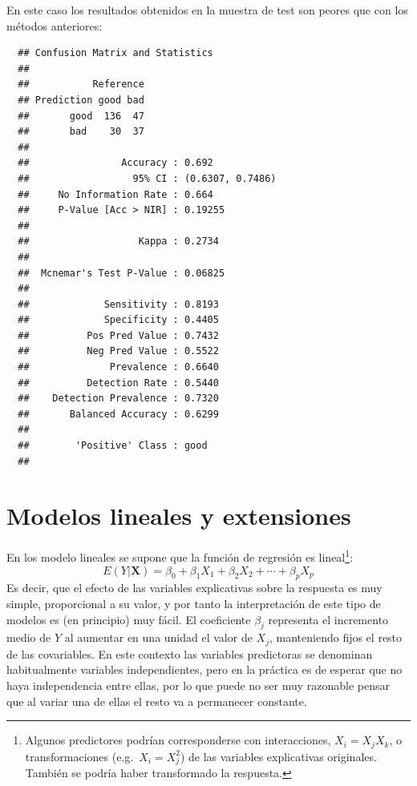 \documentclass[
]{book}
\newenvironment{Shaded}{\begin{snugshade}}{\end{snugshade}}
\newcommand{\AttributeTok}[1]{\textcolor[rgb]{0.77,0.63,0.00}{#1}}
\newcommand{\CommentTok}[1]{\textcolor[rgb]{0.56,0.35,0.01}{\textit{#1}}}
\newcommand{\FunctionTok}[1]{\textcolor[rgb]{0.00,0.00,0.00}{#1}}
\newcommand{\NormalTok}[1]{#1}
\newcommand{\OtherTok}[1]{\textcolor[rgb]{0.56,0.35,0.01}{#1}}
\newcommand{\SpecialCharTok}[1]{\textcolor[rgb]{0.00,0.00,0.00}{#1}}
\theoremstyle{break}
\theoremstyle{nonumberplain}
\renewcommand{\CommentTok}[1]{\textcolor[rgb]{0.41,0.41,0.41}{\texttt{#1}}}
\begin{document}
En este caso los resultados obtenidos en la muestra de test son peores que con los métodos anteriores:

\begin{Shaded}
\end{Shaded}

\begin{verbatim}
  ## Confusion Matrix and Statistics
  ## 
  ##           Reference
  ## Prediction good bad
  ##       good  136  47
  ##       bad    30  37
  ##                                           
  ##                Accuracy : 0.692           
  ##                  95% CI : (0.6307, 0.7486)
  ##     No Information Rate : 0.664           
  ##     P-Value [Acc > NIR] : 0.19255         
  ##                                           
  ##                   Kappa : 0.2734          
  ##                                           
  ##  Mcnemar's Test P-Value : 0.06825         
  ##                                           
  ##             Sensitivity : 0.8193          
  ##             Specificity : 0.4405          
  ##          Pos Pred Value : 0.7432          
  ##          Neg Pred Value : 0.5522          
  ##              Prevalence : 0.6640          
  ##          Detection Rate : 0.5440          
  ##    Detection Prevalence : 0.7320          
  ##       Balanced Accuracy : 0.6299          
  ##                                           
  ##        'Positive' Class : good            
  ## 
\end{verbatim}

\hypertarget{modelos-lineales}{%
\chapter{Modelos lineales y extensiones}\label{modelos-lineales}}

En los modelo lineales se supone que la función de regresión es lineal\footnote{Algunos predictores podrían corresponderse con interacciones, \(X_i = X_j X_k\), o transformaciones (e.g.~\(X_i = X_j^2\)) de las variables explicativas originales. También se podría haber transformado la respuesta.}:
\[E( Y | \mathbf{X} ) = \beta_{0}+\beta_{1}X_{1}+\beta_{2}X_{2}+\cdots+\beta_{p}X_{p}\]
Es decir, que el efecto de las variables explicativas sobre la respuesta es muy simple, proporcional a su valor, y por tanto la interpretación de este tipo de modelos es (en principio) muy fácil.
El coeficiente \(\beta_j\) representa el incremento medio de \(Y\) al aumentar en una unidad el valor de \(X_j\), manteniendo fijos el resto de las covariables.
En este contexto las variables predictoras se denominan habitualmente variables independientes, pero en la práctica es de esperar que no haya independencia entre ellas, por lo que puede no ser muy razonable pensar que al variar una de ellas el resto va a permanecer constante.
\end{document}
